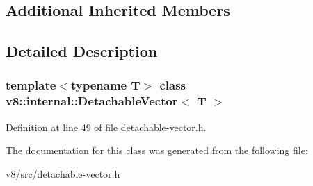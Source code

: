 \subsection*{Additional Inherited Members}


\subsection{Detailed Description}
\subsubsection*{template$<$typename T$>$\newline
class v8\+::internal\+::\+Detachable\+Vector$<$ T $>$}



Definition at line 49 of file detachable-\/vector.\+h.



The documentation for this class was generated from the following file\+:\begin{DoxyCompactItemize}
\item 
v8/src/detachable-\/vector.\+h\end{DoxyCompactItemize}
